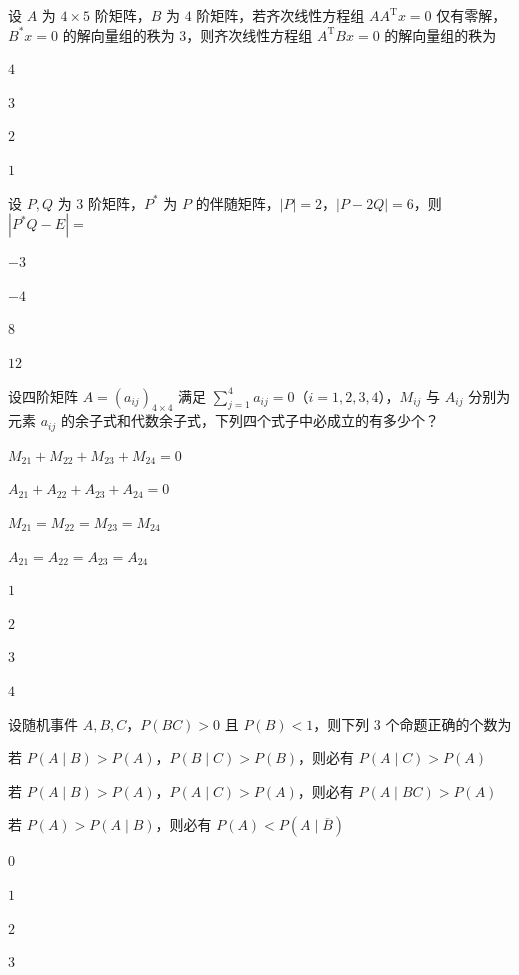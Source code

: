 \begin{question}[index=5]
设 $A$ 为 $4\times5$ 阶矩阵，$B$ 为 $4$ 阶矩阵，若齐次线性方程组 $AA^{\mathrm T}x=0$ 仅有零解，$B^*x=0$ 的\allowbreak\mbox{解向量组}的秩为 $3$，则齐次线性方程组 $A^{\mathrm T}Bx=0$ 的\allowbreak\mbox{解向量组}的秩为
\begin{choices}[columns=4]
\item $4$
\item $3$
\item $2$
\item $1$
\end{choices}
\end{question}
\QuestionBreak

\begin{question}[index=6]
设 $P,Q$ 为 $3$ 阶矩阵，$P^*$ 为 $P$ 的伴随矩阵，$|P|=2$，$|P-2Q|=6$，则 $|P^*Q-E|=$
\begin{choices}[columns=4]
\item $-3$
\item $-4$
\item $8$
\item $12$
\end{choices}
\end{question}
\QuestionBreak

\begin{question}[index=7]
设四阶矩阵 $A=(a_{ij})_{4\times4}$ 满足 $\displaystyle\sum_{j=1}^4a_{ij}=0$（$i=1,2,3,4$），$M_{ij}$ 与 $A_{ij}$ 分别为元素 $a_{ij}$ 的\allowbreak\mbox{余子式}和\allowbreak\mbox{代数余子式}，下列四个式子中必成立的有多少个？
\par{}\quad $M_{21}+M_{22}+M_{23}+M_{24}=0$
\par{}\quad $A_{21}+A_{22}+A_{23}+A_{24}=0$
\par{}\quad $M_{21}=M_{22}=M_{23}=M_{24}$
\par{}\quad $A_{21}=A_{22}=A_{23}=A_{24}$
\begin{choices}[columns=4]
\item $1$
\item $2$
\item $3$
\item $4$
\end{choices}
\end{question}
\QuestionBreak

\begin{question}[index=8]
设随机事件 $A,B,C$，$P(BC)>0$ 且 $P(B)<1$，则下列 $3$ 个命题正确的个数为
\par{}\quad 若 $P(A\mid B)>P(A)$，$P(B\mid C)>P(B)$，则必有 $P(A\mid C)>P(A)$
\par{}\quad 若 $P(A\mid B)>P(A)$，$P(A\mid C)>P(A)$，则必有 $P(A\mid BC)>P(A)$
\par{}\quad 若 $P(A)>P(A\mid B)$，则必有 $P(A)<P(A\mid\overline B)$
\begin{choices}[columns=4]
\item $0$
\item $1$
\item $2$
\item $3$
\end{choices}
\end{question}
\QuestionBreak

